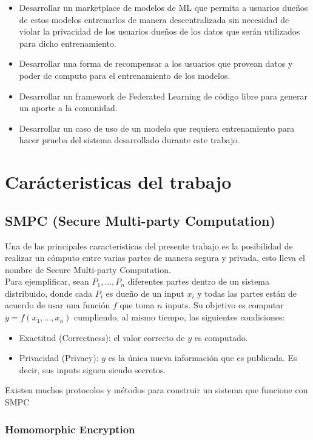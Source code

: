 \documentclass[
11pt, %
oneside, %
spanish, %
singlespacing, %
parskip, %
headsepline, %
chapterinoneline, %
]{MastersDoctoralThesis} %
\begin{document}
\begin{itemize}
\item Desarrollar un marketplace de modelos de ML que permita a usuarios dueños de estos modelos entrenarlos de manera descentralizada sin necesidad de violar la privacidad de los usuarios dueños de los datos que serán utilizados para dicho entrenamiento.  
\item Desarrollar una forma de recompensar a los usuarios que provean datos y poder de computo para el entrenamiento de los modelos.
\item Desarrollar un framework de Federated Learning de código libre para generar un aporte a la comunidad.
\item Desarrollar un caso de uso de un modelo que requiera entrenamiento para hacer prueba del sistema desarrollado durante este trabajo.
\end{itemize}


\chapter{Car\'acteristicas del trabajo}


\section{SMPC (Secure Multi-party Computation)}
\justify
Una de las principales caracteristicas del presente trabajo es la posibilidad de realizar un c\'omputo entre varias partes de manera segura y privada, esto lleva el nombre de Secure Multi-party Computation. \\ 
Para ejemplificar, sean $P_{1},...,P_{n}$ diferentes partes dentro de un sistema distribuido, donde cada $P_{i}$ es dueño de un input $x_{i}$ y todas las partes están de acuerdo de usar una función $f$ que toma $n$ inputs. Su objetivo es computar $y = f(x_{1},...,x_{n})$ cumpliendo, al mismo tiempo, las siguientes condiciones:

\begin{itemize}
\item Exactitud (Correctness): el valor correcto de $y$ es computado.
\item Privacidad (Privacy): $y$ es la \'unica nueva informaci\'on que es publicada. Es decir, sus inputs siguen siendo secretos.
\end{itemize}

Existen muchos protocolos y m\'etodos para construir un sistema que funcione con SMPC

\subsection{Homomorphic Encryption}
\end{document}
